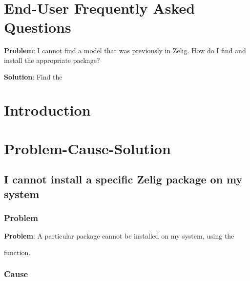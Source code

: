 \newcommand{\problem}[1] {
  {\noindent\bf Problem}: #1
}

\newcommand{\solution}[1] {
  {\noindent\bf Solution}: #1
}




\section{End-User Frequently Asked Questions}

\problem{
  I cannot find a model that was previously in Zelig. How do I find
  and install the appropriate package?
}

\solution{
  Find the

}






























\section{Introduction}

\section{Problem-Cause-Solution}



\subsection{I cannot install a specific Zelig package on my system}
\label{subsec:install-specific-package}

\subsubsection{Problem}

\problem{A particular package cannot be installed on my system, using the}
 function.

\subsubsection{Cause}

